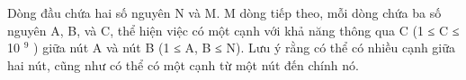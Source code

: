Dòng đầu chứa hai số nguyên N và M. M dòng tiếp theo, mỗi dòng chứa ba số nguyên A, B, và C, thể hiện việc có một cạnh với khả năng thông qua C (1 ≤ C ≤ 10   $^    9   $   ) giữa nút A và nút B (1 ≤ A, B ≤ N). Lưu ý rằng có thể có nhiều cạnh giữa hai nút, cũng như có thể có một cạnh từ một nút đến chính nó.  

\